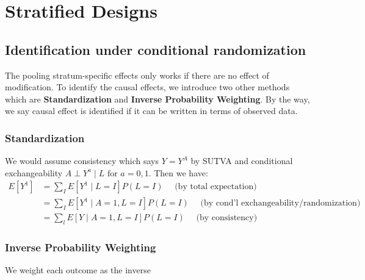 \section{Stratified Designs}
\subsection{Identification under conditional randomization}
The pooling stratum-specific effects only works if there are no effect of modification. To identify the causal effects, we introduce two other methods which are \textbf{Standardization} and \textbf{Inverse Probability Weighting}. By the way, we say causal effect is identified if it can be written in terms of observed data.
\subsubsection{Standardization}
We would assume consistency which says $Y=Y^A$ by SUTVA and conditional exchangeability $A \perp Y^a \mid L \text { for } a=0,1$. Then we have:
\begin{align*}
E\left[Y^1\right] & =\sum_I E\left[Y^1 \mid L=I\right] P(L=I) \quad \text { (by total expectation) } \\
& =\sum_I E\left[Y^1 \mid A=1, L=I\right] P(L=I) \quad \text { (by cond'l exchangeability/randomization) } \\
& =\sum_l E[Y \mid A=1, L=I] P(L=I) \quad \text { (by consistency) }
\end{align*}
\subsubsection{Inverse Probability Weighting}
We weight each outcome as the inverse 